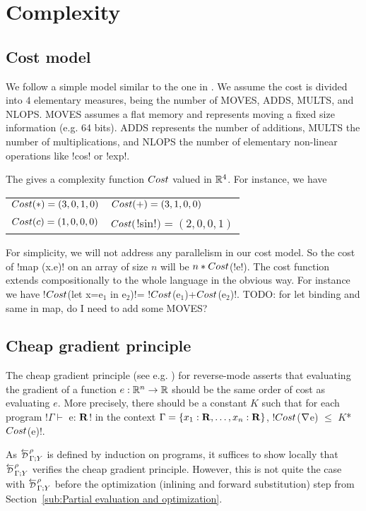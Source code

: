 \section{Complexity}
\label{sec:complexity}

\subsection{Cost model}
\label{sub:costModel}

We follow a simple model similar to the one in \cite{griewank2008evaluating}.
We assume the cost is divided into $4$ elementary measures, being the number of MOVES, ADDS, MULTS, and NLOPS.
MOVES assumes a flat memory and represents moving a fixed size information  (e.g. 64 bits). 
ADDS represents the number of additions, 
MULTS the number of multiplications, 
and NLOPS the number of elementary non-linear operations like !cos! or !exp!.

The gives a complexity function $Cost$ valued in $\mathbb{R}^4$. 
For instance, we have 

\begin{tabular}{ll}
    $Cost(*)=(3,0,1,0)$ & $Cost(+)=(3,1,0,0)$\\
    $Cost(c)=(1,0,0,0)$ & $Cost($!sin!$)=(2,0,0,1)$
\end{tabular}

For simplicity, we will not address any parallelism in our cost model. 
So the cost of !map (x.e)! on an array of size $n$ will be $n*Cost$(!e!).
The cost function extends compositionally to the whole language in the obvious way.
For instance we have !$Cost$(let x=e$_1$ in e$_2$)!= !$Cost$(e$_1$)+$Cost$(e$_2$)!.
TODO: for let binding and same in map, do I need to add some MOVES?

\subsection{Cheap gradient principle}

The cheap gradient principle (see e.g. \cite{griewank2008evaluating}) for reverse-mode
asserts that evaluating the gradient of a function $e:\mathbb{R}^n\to\mathbb{R}$ 
should be the same order of cost as evaluating $e$. 
More precisely, there should be a constant $K$ such that for each program !$\Gamma \vdash$ e: $\mathbf{R}$! in the context $\Gamma=\{x_1:\mathbf{R},\ldots,x_n:\mathbf{R}\}$,
 !$Cost$($\nabla$e) $\leq$ $K$*$Cost$(e)!.

As $\directD{\rho}{\Gamma}{Y}$ is defined by induction on programs, it suffices to show locally 
that $\directD{\rho}{\Gamma}{Y}$ verifies the cheap gradient principle. 
However, this is not quite the case with $\directD{\rho}{\Gamma}{Y}$ 
before the optimization (inlining and forward substitution) step from Section~\ref{sub:Partial evaluation and optimization}.

